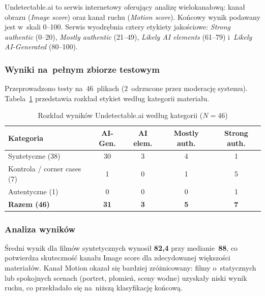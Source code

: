 Undetectable.ai to serwis internetowy oferuj\k{a}cy analiz\k{e} wielokana\l{}ow\k{a}:
kana\l{} obrazu (\emph{Image score}) oraz kana\l{} ruchu (\emph{Motion score}).
Ko\'{n}cowy wynik podawany jest w~skali 0--100.
Serwis wyodr\k{e}bnia cztery etykiety jako\'{s}ciowe:
\emph{Strong authentic} (0--20),
\emph{Mostly authentic} (21--49),
\emph{Likely AI elements} (61--79)
i~\emph{Likely AI-Generated} (80--100).

\subsubsection{Wyniki na~pe\l{}nym zbiorze testowym}

Przeprowadzono testy na~46~plikach (2~odrzucone przez moderacj\k{e} systemu).
Tabela~\ref{tab:undetectable_summary} przedstawia rozk\l{}ad etykiet
wed\l{}ug kategorii materia\l{}u.

\begin{table}[htbp]
\centering
{\setlength{\tabcolsep}{7pt}\renewcommand{\arraystretch}{1.3}
\caption{Rozk\l{}ad wynik\'{o}w Undetectable.ai wed\l{}ug kategorii ($N=46$)}
\label{tab:undetectable_summary}
\small
\begin{tabular}{lcccc}
\toprule
\textbf{Kategoria} &
\textbf{AI-Gen.} &
\textbf{AI elem.} &
\textbf{Mostly auth.} &
\textbf{Strong auth.} \\
\midrule
Syntetyczne (38)              & 30 & 3 & 4 & 1 \\
Kontrola / corner cases (7)   &  1 & 0 & 1 & 5 \\
Autentyczne (1)               &  0 & 0 & 0 & 1 \\
\midrule
\textbf{Razem (46)} & \textbf{31} & \textbf{3} & \textbf{5} & \textbf{7} \\
\bottomrule
\end{tabular}}
\end{table}

\subsubsection{Analiza wynik\'{o}w}

\'{S}redni wynik dla film\'{o}w syntetycznych wynosi\l{} \textbf{82{,}4}
przy medianie~\textbf{88}, co potwierdza skuteczno\'{s}\'{c}
kana\l{}u Image score dla zdecydowanej wi\k{e}kszo\'{s}ci materia\l{}\'{o}w.
Kana\l{} Motion okaza\l{} si\k{e} bardziej zr\'{o}\.{z}nicowany:
filmy o~statycznych lub spokojnych scenach (portret, p\l{}omie\'{n},
sceny wodne) uzyska\l{}y niski wynik ruchu, co przek\l{}ada\l{}o si\k{e}
na~ni\.{z}sz\k{a} klasyfikacj\k{e} ko\'{n}cow\k{a}.

